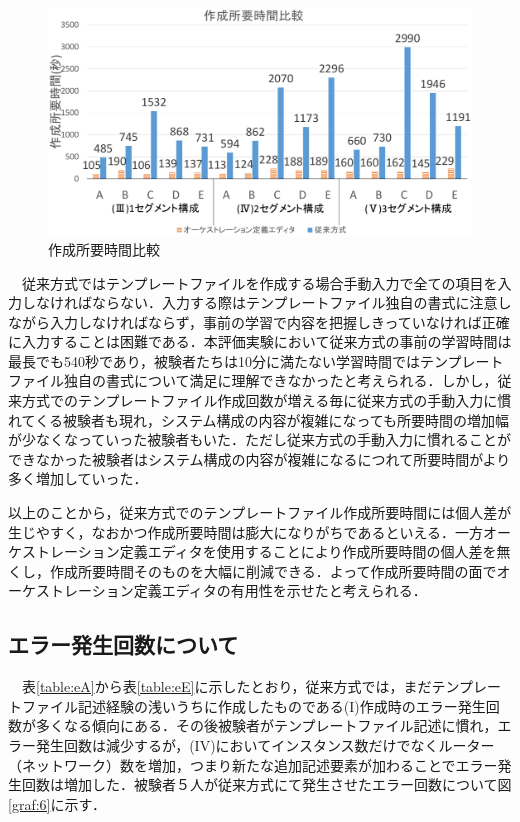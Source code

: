 \documentclass[mingoth]{kut-paper}		%
\begin{document}
		\begin{figure}[H]
			\begin{center}
				\includegraphics[scale=0.42]{Document/Create_alltime.eps}
				\caption{作成所要時間比較}
				\label{graf:9}
			\end{center}
		\end{figure}
		
		　従来方式ではテンプレートファイルを作成する場合手動入力で全ての項目を入力しなければならない．入力する際はテンプレートファイル独自の書式に注意しながら入力しなければならず，事前の学習で内容を把握しきっていなければ正確に入力することは困難である．本評価実験において従来方式の事前の学習時間は最長でも540秒であり，被験者たちは10分に満たない学習時間ではテンプレートファイル独自の書式について満足に理解できなかったと考えられる．しかし，従来方式でのテンプレートファイル作成回数が増える毎に従来方式の手動入力に慣れてくる被験者も現れ，システム構成の内容が複雑になっても所要時間の増加幅が少なくなっていった被験者もいた．ただし従来方式の手動入力に慣れることができなかった被験者はシステム構成の内容が複雑になるにつれて所要時間がより多く増加していった．
		
		 以上のことから，従来方式でのテンプレートファイル作成所要時間には個人差が生じやすく，なおかつ作成所要時間は膨大になりがちであるといえる．一方オーケストレーション定義エディタを使用することにより作成所要時間の個人差を無くし，作成所要時間そのものを大幅に削減できる．よって作成所要時間の面でオーケストレーション定義エディタの有用性を示せたと考えられる．
		
		\subsection{エラー発生回数について}
		　表\ref{table:eA}から表\ref{table:eE}に示したとおり，従来方式では，まだテンプレートファイル記述経験の浅いうちに作成したものである(I)作成時のエラー発生回数が多くなる傾向にある．その後被験者がテンプレートファイル記述に慣れ，エラー発生回数は減少するが，(I\hspace{-1pt}V)においてインスタンス数だけでなくルーター（ネットワーク）数を増加，つまり新たな追加記述要素が加わることでエラー発生回数は増加した．被験者５人が従来方式にて発生させたエラー回数について図\ref{graf:6}に示す．
\end{document}
